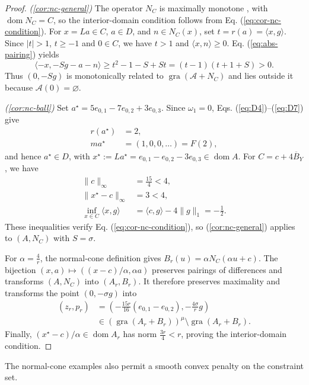 \documentclass[11pt]{article}
\newcommand{\gra}{\operatorname{gra}}
\newcommand{\dom}{\operatorname{dom}}
\newcommand{\pair}[2]{\langle #1,#2\rangle}
\theoremstyle{definition}
\theoremstyle{remark}
\begin{document}
\begin{proof}
\noindent\textit{\textup{(\ref{cor:nc-general})}}
The operator $N_C$ is maximally monotone \cite{rockafellar1970subdiff}, with $\dom N_C=C$, so the interior-domain condition follows from Eq. (\ref{eq:cor-nc-condition}). For $x=La\in C$, $a\in D$, and $n\in N_C(x)$, set $t=r(a)=\pair{x}{g}$. Since $|t|>1$, $t\ge-1$ and $0\in C$, we have $t>1$ and $\pair{x}{n}\ge0$. Eq. (\ref{eq:abs-pairing}) yields
\[
\pair{-x}{-Sg-a-n}
\ge t^2-1-S+St
=(t-1)(t+1+S)>0.
\]
Thus $(0,-Sg)$ is monotonically related to $\gra(\mathcal A+N_C)$ and lies outside it because $\mathcal A(0)=\varnothing$.

\noindent\textit{\textup{(\ref{cor:nc-ball})}}
Set $a^\star=5e_{0,1}-7e_{0,2}+3e_{0,3}$. Since $\omega_1=0$, Eqs. (\ref{eq:D4})--(\ref{eq:D7}) give
\[
\begin{aligned}
r(a^\star)&=2,\\
ma^\star&=(1,0,0,\ldots)=F(2),
\end{aligned}
\]
and hence $a^\star\in D$, with $x^\star:=La^\star=e_{0,1}-e_{0,2}-3e_{0,3}\in\dom A$. For $C=c+4\overline B_Y$, we have
\[
\begin{aligned}
\|c\|_\infty&=\frac{15}{4}<4,\\
\|x^\star-c\|_\infty&=3<4,\\
\inf_{x\in C}\pair{x}{g}&=\pair{c}{g}-4\|g\|_1=-\frac12.
\end{aligned}
\]
These inequalities verify Eq. (\ref{eq:cor-nc-condition}), so \textup{(\ref{cor:nc-general})} applies to $(A,N_C)$ with $S=\sigma$.

For $\alpha=\frac4r$, the normal-cone definition gives $B_r(u)=\alpha N_C(\alpha u+c)$. The bijection $(x,a)\mapsto((x-c)/\alpha,\alpha a)$ preserves pairings of differences and transforms $(A,N_C)$ into $(A_r,B_r)$. It therefore preserves maximality and transforms the point $(0,-\sigma g)$ into
\begin{equation}
\begin{aligned}
(z_r,p_r)&=\left(-\frac{15r}{16}(e_{0,1}-e_{0,2}),-\frac{4\sigma}{r}g\right)\\
&\in(\gra(A_r+B_r))^\mu\setminus\gra(A_r+B_r).
\end{aligned}
\label{eq:cor-ball-witness}
\end{equation}
Finally, $(x^\star-c)/\alpha\in\dom A_r$ has norm $\frac{3r}{4}<r$, proving the interior-domain condition.
\end{proof}

The normal-cone examples also permit a smooth convex penalty on the constraint set.
\end{document}
